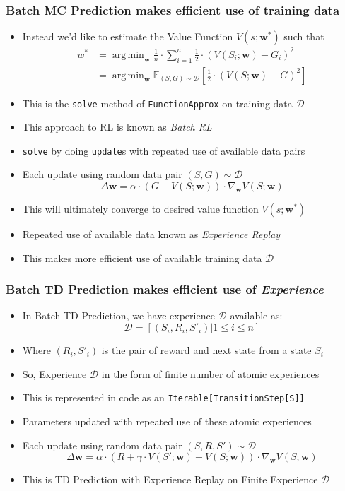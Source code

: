 \documentclass[handout]{beamer}
\DeclareMathOperator*{\argmin}{arg\,min}
\begin{document}
\begin{frame}
\frametitle{Batch MC Prediction makes efficient use of training data}
\pause
\begin{itemize}[<+->]
\item Instead we'd like to estimate the Value Function $V(s;\bm{w^*})$ such that
\begin{align*}
w^* & = \argmin_{\bm{w}} \frac 1 n \cdot \sum_{i=1}^n \frac 1 2 \cdot (V(S_i;\bm{w}) - G_i)^2 \\
& = \argmin_{\bm{w}} \mathbb{E}_{(S,G) \sim \mathcal{D}} [\frac 1 2 \cdot (V(S; \bm{w}) - G)^2]
\end{align*}
\item This is the \lstinline{solve} method of \lstinline{FunctionApprox} on training data $\mathcal{D}$
\item This approach to RL is known as {\em Batch RL}
\item \lstinline{solve} by doing \lstinline{update}s with repeated use of available data pairs
\item Each update using random data pair $(S,G) \sim \mathcal{D}$
$$\Delta \bm{w} = \alpha \cdot (G - V(S; \bm{w})) \cdot \nabla_{\bm{w}} V(S; \bm{w})$$
\item This will ultimately converge to desired value function $V(s;\bm{w^*})$
\item Repeated use of available data  known as {\em Experience Replay} 
\item This makes more efficient use of available training data $\mathcal{D}$
\end{itemize}
\end{frame}

\begin{frame}
\frametitle{Batch TD Prediction makes efficient use of {\em Experience}}
\pause
\begin{itemize}[<+->]
\item In Batch TD Prediction, we have experience $\mathcal{D}$ available as:
$$\mathcal{D} = [(S_i, R_i, S'_i) | 1 \leq i \leq n]$$
\item Where $(R_i, S'_i)$ is the pair of reward and next state from a state $S_i$
\item So, Experience $\mathcal{D}$ in the form of finite number of atomic experiences
\item This is represented in code as an \lstinline{Iterable[TransitionStep[S]]}
\item Parameters updated with repeated use of these atomic experiences
\item Each update using random data pair $(S,R,S') \sim \mathcal{D}$
$$\Delta \bm{w} = \alpha \cdot (R + \gamma \cdot V(S'; \bm{w}) - V(S; \bm{w})) \cdot \nabla_{\bm{w}} V(S; \bm{w})$$
\item This is TD Prediction with Experience Replay on Finite Experience $\mathcal{D}$
\end{itemize}
\end{frame}
\end{document}
